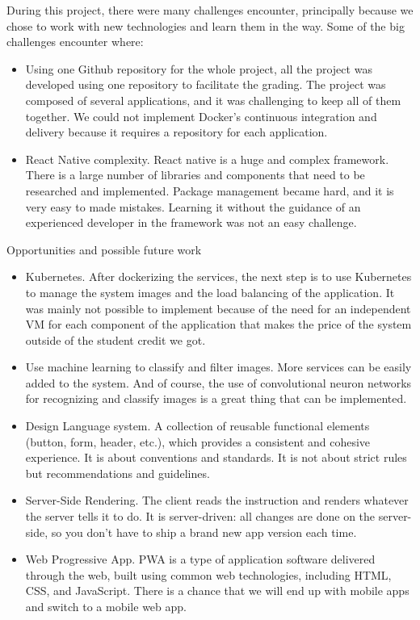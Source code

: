 During this project, there were many challenges encounter, principally because we chose to work with new technologies and learn them in the way. Some of the big challenges encounter where:

\begin{itemize}
	

\item Using one Github repository for the whole project, all the project was developed using one repository to facilitate the grading. The project was composed of several applications, and it was challenging to keep all of them together. We could not implement Docker's continuous integration and delivery because it requires a  repository for each application.

\item  React Native complexity. React native is a huge and complex framework. There is a large number of libraries and components that need to be researched and implemented. Package management became hard, and it is very easy to made mistakes. Learning it without the guidance of an experienced developer in the framework was not an easy challenge. 
\end{itemize}

Opportunities and possible future work

\begin{itemize}


	\item  Kubernetes. After dockerizing the services, the next step is to use Kubernetes to manage the system images and the load balancing of the application. It was mainly not possible to implement because of the need for an independent VM for each component of the application that makes the price of the system outside of the student credit we got.

	\item  Use machine learning to classify and filter images. More services can be easily added to the system. And of course, the use of convolutional neuron networks for recognizing and classify images is a great thing that can be implemented.

	\item  Design Language system. A collection of reusable functional elements (button, form, header, etc.), which provides a consistent and cohesive experience. It is about conventions and standards. It is not about strict rules but recommendations and guidelines.

	\item  Server-Side Rendering. The client reads the instruction and renders whatever the server tells it to do. It is server-driven: all changes are done on the server-side, so you don't have to ship a brand new app version each time.

	\item  Web Progressive App. PWA is a type of application software delivered through the web, built using common web technologies, including HTML, CSS, and JavaScript. There is a chance that we will end up with mobile apps and switch to a mobile web app.
\end{itemize}